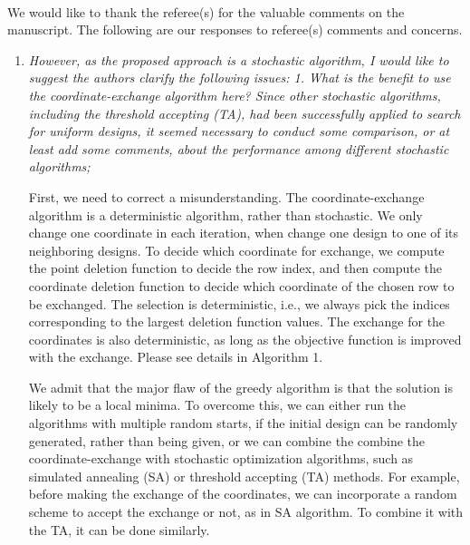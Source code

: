 \documentclass[12pt]{article}
\theoremstyle{definition}
\begin{document}
\chead{ }
\cfoot{\thepage}


\thispagestyle{empty}
\begin{center}
\\
\end{center}

\bigskip

We would like to thank the referee(s) for the valuable comments on the manuscript. The following are our responses to referee(s) comments and concerns.

\begin{enumerate}
\item
\emph{However, as the proposed approach is a stochastic algorithm, I would like to suggest the authors clarify the following issues: 1. What is the benefit to use the coordinate-exchange algorithm here? Since other stochastic algorithms, including the threshold accepting (TA), had been successfully applied to search for uniform designs, it seemed necessary to conduct some comparison, or at least add some comments, about the performance among different stochastic algorithms;}

First, we need to correct a misunderstanding. 
The coordinate-exchange algorithm is a deterministic algorithm, rather than stochastic. 
We only change one coordinate in each iteration, when change one design to one of its neighboring designs. 
To decide which coordinate for exchange, we compute the point deletion function to decide the row index, and then compute the coordinate deletion function to decide which coordinate of the chosen row to be exchanged. 
The selection is deterministic, i.e., we always pick the indices corresponding to the largest deletion function values. 
The exchange for the coordinates is also deterministic, as long as the objective function is improved with the exchange. 
Please see details in Algorithm 1. 

We admit that the major flaw of the greedy algorithm is that the solution is likely to be a local minima. 
To overcome this, we can either run the algorithms with multiple random starts, if the initial design can be randomly generated, rather than being given, or we can combine the combine the coordinate-exchange with stochastic optimization algorithms, such as simulated annealing (SA) or threshold accepting (TA) methods. 
For example, before making the exchange of the coordinates, we can incorporate a random scheme to accept the exchange or not, as in SA algorithm. 
To combine it with the TA, it can be done similarly. 



\end{enumerate}
\end{document}
